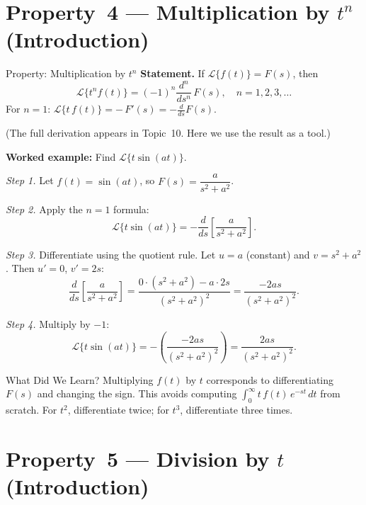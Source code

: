 \documentclass[12pt,a4paper]{article}
\begin{document}
\section{Property~4 --- Multiplication by $t^n$ (Introduction)}

\begin{infobox}{Property: Multiplication by $t^n$}
\textbf{Statement.} If $\mathcal{L}\{f(t)\} = F(s)$, then
\[
  \mathcal{L}\{t^n f(t)\} = (-1)^n \frac{d^n}{ds^n}\,F(s), \quad n = 1, 2, 3, \ldots
\]
For $n=1$: $\displaystyle\mathcal{L}\{t\,f(t)\} = -\,F'(s) = -\frac{d}{ds}F(s)$.

(The full derivation appears in Topic~10. Here we use the result as a tool.)

\bigskip
\textbf{Worked example: } Find $\mathcal{L}\{t\sin(at)\}$.

\emph{Step 1.} Let $f(t) = \sin(at)$, so $F(s) = \dfrac{a}{s^2+a^2}$.

\emph{Step 2.} Apply the $n=1$ formula:
\[
  \mathcal{L}\{t\sin(at)\} = -\frac{d}{ds}\left[\frac{a}{s^2+a^2}\right].
\]

\emph{Step 3.} Differentiate using the quotient rule. Let $u = a$ (constant) and
$v = s^2+a^2$. Then $u'=0$, $v'=2s$:
\[
  \frac{d}{ds}\left[\frac{a}{s^2+a^2}\right]
  = \frac{0\cdot(s^2+a^2) - a\cdot 2s}{(s^2+a^2)^2}
  = \frac{-2as}{(s^2+a^2)^2}.
\]

\emph{Step 4.} Multiply by $-1$:
\[
  \mathcal{L}\{t\sin(at)\} = -\left(\frac{-2as}{(s^2+a^2)^2}\right) = \frac{2as}{(s^2+a^2)^2}.
\]
\end{infobox}

\begin{learnbox}{What Did We Learn?}
Multiplying $f(t)$ by $t$ corresponds to differentiating $F(s)$ and changing the sign. This
avoids computing $\int_0^\infty t\,f(t)\,e^{-st}\,dt$ from scratch. For $t^2$, differentiate
twice; for $t^3$, differentiate three times.
\end{learnbox}

\section{Property~5 --- Division by $t$ (Introduction)}
\end{document}
